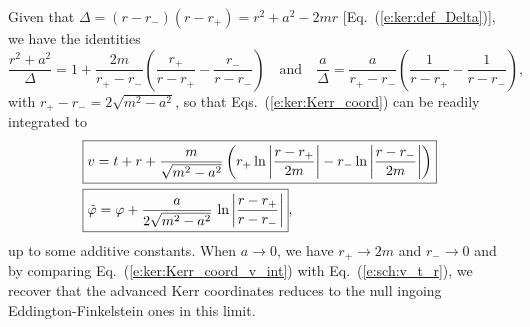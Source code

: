Given that $\Delta = (r-r_-)(r-r_+) = r^2+a^2 - 2mr$ [Eq.~(\ref{e:ker:def_Delta})], we have
the identities
\[
    \frac{r^2+a^2}{\Delta} = 1 + \frac{2m}{r_+-r_-} \left( \frac{r_+}{r-r_+}
        - \frac{r_-}{r-r_-} \right) \quad\mbox{and}\quad
     \frac{a}{\Delta} = \frac{a}{r_+-r_-} \left( \frac{1}{r-r_+}
        - \frac{1}{r-r_-} \right) ,
\]
with $r_+-r_- = 2\sqrt{m^2-a^2}$,
so that Eqs.~(\ref{e:ker:Kerr_coord}) can be readily integrated to
\begin{subequations}
\label{e:ker:Kerr_coord_int}
\begin{align}
& \fbox{$\displaystyle v = t + r + \frac{m}{\sqrt{m^2-a^2}} \left(
    r_+ \ln\left| \frac{r-r_+}{2m} \right|
    - r_- \ln\left| \frac{r-r_-}{2m} \right| \right) $}\label{e:ker:Kerr_coord_v_int}\\
& \fbox{$\displaystyle  {\tilde\varphi} = \varphi + \frac{a}{2\sqrt{m^2-a^2}}\, \ln \left|
    \frac{r-r_+}{r-r_-} \right| $} , \label{e:ker:Kerr_coord_tph_int}
\end{align}
\end{subequations}
up to some additive constants.
When $a\rightarrow 0$, we have $r_+\rightarrow 2m$ and $r_-\rightarrow 0$
and by comparing Eq.~(\ref{e:ker:Kerr_coord_v_int}) with Eq.~(\ref{e:sch:v_t_r}), we recover
that the advanced Kerr coordinates reduces to the null ingoing Eddington-Finkelstein
ones in this limit.

